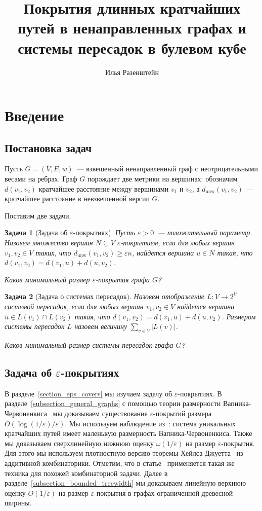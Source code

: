 \documentclass[12pt]{article}
\title{Покрытия длинных кратчайших путей в ненаправленных графах и системы пересадок в булевом кубе}
\author{Илья Разенштейн}
\date{}
\newcommand{\eps}{\varepsilon}
\newcommand{\dunw}{d_{\mathrm{unw}}}
\newcommand{\abs}[1]{\left|#1\right|}
\newtheorem{problem}{Задача}
\begin{document}
    \maketitle
    \section{Введение}
    \subsection{Постановка задач}
    Пусть $G = (V, E, w)$~--- взвешенный ненаправленный граф с неотрицательными весами на ребрах.
    Граф $G$ порождает две метрики на вершинах: обозначим $d(v_1, v_2)$ кратчайшее расстояние между вершинами $v_1$
    и $v_2$, а $\dunw(v_1, v_2)$~--- кратчайшее расстояние в невзвешенной версии $G$.

    Поставим две задачи.
    \begin{problem}[Задача об $\eps$-покрытиях]
        Пусть $\eps > 0$~--- положительный параметр. Назовем множество вершин $N \subseteq V$ \emph{$\eps$-покрытием},
        если для любых вершин $v_1, v_2 \in V$ таких, что $\dunw(v_1, v_2) \geq \eps n$, найдется вершина $u \in N$
        такая, что $d(v_1, v_2) = d(v_1, u) + d(u, v_2)$.

        Каков минимальный размер $\eps$-покрытия графа $G$?
    \end{problem}
    \begin{problem}[Задача о системах пересадок]
        Назовем отображение $L \colon V \to 2^V$ \emph{системой пересадок}, если для любых вершин $v_1, v_2 \in V$
        найдется вершина $u \in L(v_1) \cap L(v_2)$ такая, что $d(v_1, v_2) = d(v_1, u) + d(u, v_2)$.
        \emph{Размером} системы пересадок $L$ назовем величину $\sum_{v \in V} \abs{L(v)}$. 

        Каков минимальный размер системы пересадок графа $G$?
    \end{problem}
    \subsection{Задача об $\eps$-покрытиях}
    В разделе~\ref{section_eps_covers} мы изучаем задачу об $\eps$-покрытиях.
    В разделе~\ref{subsection_general_graphs} с помощью теории размерности Вапника-Червоненкиса~\cite{VC71}
    мы доказываем существование $\eps$-покрытий размера $O(\log(1 / \eps) / \eps)$.
    Мы используем наблюдение из~\cite{ADFGW11}: система уникальных кратчайших путей имеет маленькую размерность
    Вапника-Червоненкиса.
    Также мы доказываем сверхлинейную нижнюю оценку $\omega(1 / \eps)$ на размер $\eps$-покрытия.
    Для этого мы используем плотностную версию теоремы Хейлса-Джуетта~\cite{P09} из аддитивной комбинаторики.
    Отметим, что в статье~\cite{A10} применяется такая же техника для похожей комбинаторной задачи.
    Далее в разделе~\ref{subsection_bounded_treewidth} мы доказываем линейную верхнюю оценку $O(1 / \eps)$
    на размер $\eps$-покрытия в графах ограниченной древесной ширины.
\end{document}
